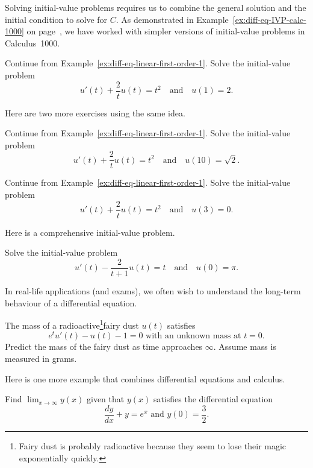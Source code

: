 \documentclass[../main.tex]{subfiles}
\begin{document}
Solving initial-value problems requires us to combine the general solution and the initial condition to solve for \(C\).  As demonstrated in Example~\ref{ex:diff-eq-IVP-calc-1000} on page~\pageref{ex:diff-eq-IVP-calc-1000}, we have worked with simpler versions of initial-value problems in Calculus~1000.

\begin{example}
  Continue from Example~\ref{ex:diff-eq-linear-first-order-1}. Solve the initial-value problem 
  \[
    u'(t) + \frac{2}{t} u(t) = t^{2} \quad\text{and}\quad u(1) = 2.
  \]
\end{example}

Here are two more exercises using the same idea.
\begin{example}
  Continue from Example~\ref{ex:diff-eq-linear-first-order-1}. Solve the initial-value problem 
  \[
    u'(t) + \frac{2}{t} u(t) = t^{2} \quad\text{and}\quad u(10) = \sqrt{2}.
  \]
\end{example}

\begin{example}
  Continue from Example~\ref{ex:diff-eq-linear-first-order-1}. Solve the initial-value problem 
  \[
    u'(t) + \frac{2}{t} u(t) = t^{2} \quad\text{and}\quad u(3) = 0.
  \]
\end{example}
\clearpage

Here is a comprehensive initial-value problem.
\begin{example}
  Solve the initial-value problem
  \[
    u'(t) - \frac{2}{t+1} u(t) = t \quad\text{and}\quad u(0) = \pi.
  \]
\end{example}

In real-life applications (and exams), we often wish to understand the long-term behaviour of a differential equation.
\begin{example}
  The mass of a radioactive\footnote{Fairy dust is probably radioactive because they seem to lose their magic exponentially quickly.}fairy dust \(u(t)\) satisfies 
  \[
    e^{t}u'(t) - u(t) - 1 = 0 \text{ with an unknown mass at \(t = 0\)}.
  \]
  Predict the mass of the fairy dust as time approaches \(\infty\). Assume mass is measured in grams.
  
\end{example}

Here is one more example that combines differential equations and calculus. 
\begin{example}
  Find \(\lim_{x \to \infty} y(x)\) given that \(y(x)\) satisfies the differential equation
  \[
    \frac{dy}{dx} + y = e^{x} \text{ and \(y(0) = \frac{3}{2}\)}.
  \]
\end{example}
\clearpage
\end{document}
